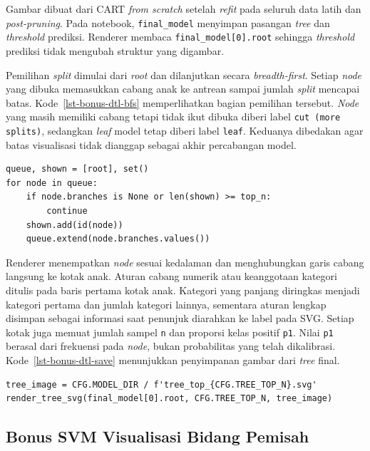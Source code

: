 Gambar dibuat dari CART \textit{from scratch} setelah \textit{refit} pada seluruh data latih dan \textit{post-pruning}. Pada notebook, \texttt{final\_model} menyimpan pasangan \textit{tree} dan \textit{threshold} prediksi. Renderer membaca \texttt{final\_model[0].root} sehingga \textit{threshold} prediksi tidak mengubah struktur yang digambar.

Pemilihan \textit{split} dimulai dari \textit{root} dan dilanjutkan secara \textit{breadth-first}. Setiap \textit{node} yang dibuka memasukkan cabang anak ke antrean sampai jumlah \textit{split} mencapai batas. Kode~\ref{lst-bonus-dtl-bfs} memperlihatkan bagian pemilihan tersebut. \textit{Node} yang masih memiliki cabang tetapi tidak ikut dibuka diberi label \texttt{cut (more splits)}, sedangkan \textit{leaf} model tetap diberi label \texttt{leaf}. Keduanya dibedakan agar batas visualisasi tidak dianggap sebagai akhir percabangan model.

\begin{lstlisting}[caption={Pemilihan split secara breadth-first},label={lst-bonus-dtl-bfs}]
queue, shown = [root], set()
for node in queue:
    if node.branches is None or len(shown) >= top_n:
        continue
    shown.add(id(node))
    queue.extend(node.branches.values())
\end{lstlisting}

Renderer menempatkan \textit{node} sesuai kedalaman dan menghubungkan garis cabang langsung ke kotak anak. Aturan cabang numerik atau keanggotaan kategori ditulis pada baris pertama kotak anak. Kategori yang panjang diringkas menjadi kategori pertama dan jumlah kategori lainnya, sementara aturan lengkap disimpan sebagai informasi saat penunjuk diarahkan ke label pada SVG. Setiap kotak juga memuat jumlah sampel \texttt{n} dan proporsi kelas positif \texttt{p1}. Nilai \texttt{p1} berasal dari frekuensi pada \textit{node}, bukan probabilitas yang telah dikalibrasi. Kode~\ref{lst-bonus-dtl-save} menunjukkan penyimpanan gambar dari \textit{tree} final.

\begin{lstlisting}[caption={Penyimpanan gambar dari CART final},label={lst-bonus-dtl-save}]
tree_image = CFG.MODEL_DIR / f'tree_top_{CFG.TREE_TOP_N}.svg'
render_tree_svg(final_model[0].root, CFG.TREE_TOP_N, tree_image)
\end{lstlisting}

\subsection{Bonus SVM Visualisasi Bidang Pemisah}

